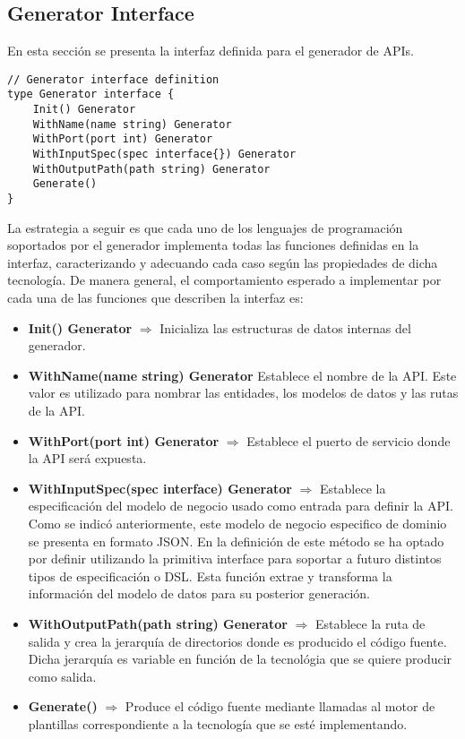 \documentclass{svproc}
\begin{document}
\subsection{Generator Interface}

En esta sección se presenta la interfaz definida para el generador de APIs.

\begin{lstlisting}
// Generator interface definition
type Generator interface {
	Init() Generator
	WithName(name string) Generator
	WithPort(port int) Generator
	WithInputSpec(spec interface{}) Generator
	WithOutputPath(path string) Generator
	Generate()
}
\end{lstlisting}

La estrategia a seguir es que cada uno de los lenguajes de programación soportados por el generador implementa todas las funciones definidas en la interfaz, caracterizando y adecuando cada caso según las propiedades de dicha tecnología. De manera general, el comportamiento esperado a implementar por cada una de las funciones que describen la interfaz es:

 \begin{itemize}
 \item \textbf{Init() Generator} 	$\Rightarrow$ Inicializa las estructuras de datos internas del generador. 
 \item \textbf{WithName(name string) Generator} Establece el nombre de la API. Este valor es utilizado para nombrar las entidades, los modelos de datos y las rutas de la API. 

 \item \textbf{WithPort(port int) Generator} $\Rightarrow$  Establece el puerto de servicio donde la API será expuesta. 
 
 \item \textbf{WithInputSpec(spec interface{}) Generator} $\Rightarrow$  Establece la especificación del modelo de negocio usado como entrada para definir la API. Como se indicó anteriormente, este modelo de negocio especifico de dominio se presenta en formato JSON. En la definición de este método se ha optado por definir utilizando la primitiva interface para soportar a futuro distintos tipos de especificación o DSL. Esta función extrae y transforma la información del modelo de datos para su posterior generación. 
 
 \item \textbf{WithOutputPath(path string) Generator} $\Rightarrow$  Establece la ruta de salida y crea la jerarquía de directorios donde es  producido el código fuente.  Dicha jerarquía es variable en función de la tecnológia que se quiere producir como salida. 
 
 \item \textbf{Generate()} $\Rightarrow$ Produce el código fuente mediante llamadas al motor de plantillas correspondiente a la tecnología que se esté implementando. 
 \end{itemize}
\end{document}
